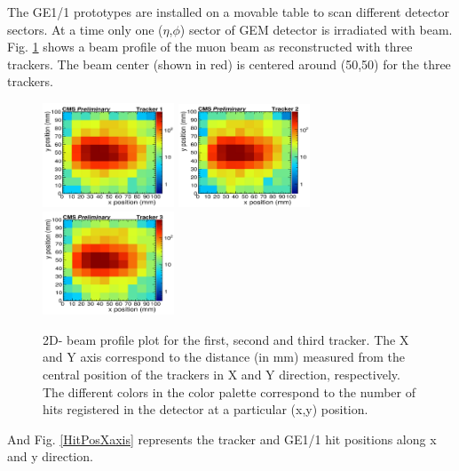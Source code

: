 The GE1/1 prototypes are installed on a movable table to scan different detector sectors. At a time only one ($\eta$,$\phi$) sector of GEM detector is irradiated with beam.
Fig. \ref{BeamProfile} shows a beam profile of the muon beam as reconstructed with three trackers. The beam center (shown in red) is centered around (50,50) for the three trackers.
\begin{figure}[!htbp]
\centering
\includegraphics[width=0.35\textwidth]{figures/GEM/Selection_027.png}%
\includegraphics[width=0.35\textwidth]{figures/GEM/Selection_028.png}%
\includegraphics[width=0.35\textwidth]{figures/GEM/Selection_029.png}
\caption{2D- beam profile plot for the first, second and third tracker. The X and Y axis correspond to the distance (in mm) measured from the central position of the trackers in X and Y direction, respectively. The different colors in the color palette correspond to the number of hits registered in the detector at a particular (x,y) position.}\label{BeamProfile}
\end{figure}
And Fig. \ref{HitPosXaxis} represents the tracker and GE1/1 hit positions along x and y direction.
